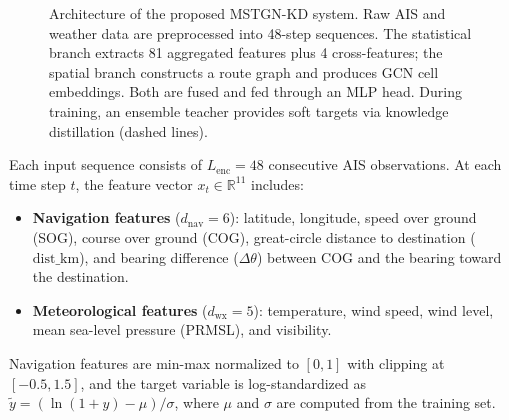 \documentclass[sigconf,anonymous]{acmart}%
\begin{document}
\begin{figure}[t]
\caption{Architecture of the proposed MSTGN-KD system. Raw AIS and weather data are preprocessed into 48-step sequences. The statistical branch extracts 81 aggregated features plus 4 cross-features; the spatial branch constructs a route graph and produces GCN cell embeddings. Both are fused and fed through an MLP head. During training, an ensemble teacher provides soft targets via knowledge distillation (dashed lines).}
\label{fig:architecture}
\end{figure}

Each input sequence consists of $L_{\text{enc}} = 48$ consecutive AIS observations. At each time step $t$, the feature vector $x_t \in \mathbb{R}^{11}$ includes:
\begin{itemize}
    \item \textbf{Navigation features} ($d_{\text{nav}} = 6$): latitude, longitude, speed over ground (SOG), course over ground (COG), great-circle distance to destination ($\text{dist\_km}$), and bearing difference ($\Delta\theta$) between COG and the bearing toward the destination.
    \item \textbf{Meteorological features} ($d_{\text{wx}} = 5$): temperature, wind speed, wind level, mean sea-level pressure (PRMSL), and visibility.
\end{itemize}
Navigation features are min-max normalized to $[0,1]$ with clipping at $[-0.5,1.5]$, and the target variable is log-standardized as $\tilde{y} = (\ln(1+y)-\mu)/\sigma$, where $\mu$ and $\sigma$ are computed from the training set.
\end{document}

